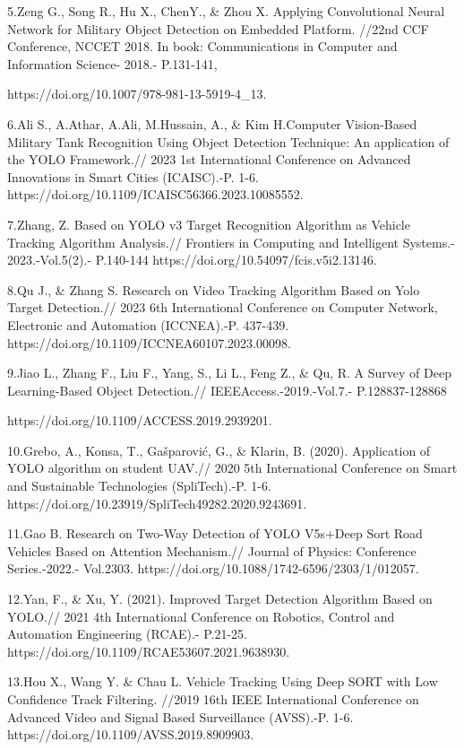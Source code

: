 5.Zeng G., Song R., Hu X., ChenY., \& Zhou X. Applying Convolutional
Neural Network for Military Object Detection on Embedded Platform.
//22nd CCF Conference, NCCET 2018. In book: Communications in Computer
and Information Science- 2018.- P.131-141,

https://doi.org/10.1007/978-981-13-5919-4\_13.

6.Ali S., A.Athar, A.Ali, M.Hussain, A., \& Kim H.Computer Vision-Based
Military Tank Recognition Using Object Detection Technique: An
application of the YOLO Framework.// 2023 1st International Conference
on Advanced Innovations in Smart Cities (ICAISC).-P. 1-6.
https://doi.org/10.1109/ICAISC56366.2023.10085552.

7.Zhang, Z. Based on YOLO v3 Target Recognition Algorithm as Vehicle
Tracking Algorithm Analysis.// Frontiers in Computing and Intelligent
Systems.- 2023.-Vol.5(2).- P.140-144
https://doi.org/10.54097/fcis.v5i2.13146.~

8.Qu J., \& Zhang S. Research on Video Tracking Algorithm Based on Yolo
Target Detection.// 2023 6th International Conference on Computer
Network, Electronic and Automation (ICCNEA).-P. 437-439.
https://doi.org/10.1109/ICCNEA60107.2023.00098.

9.Jiao L., Zhang F., Liu F., Yang, S., Li L., Feng Z., \& Qu, R. A
Survey of Deep Learning-Based Object Detection.//
IEEEAccess.-2019.-Vol.7.- P.128837-128868

https://doi.org/10.1109/ACCESS.2019.2939201.

10.Grebo, A., Konsa, T., Gašparović, G., \& Klarin, B. (2020).
Application of YOLO algorithm on student UAV.// 2020 5th International
Conference on Smart and Sustainable Technologies (SpliTech).-P. 1-6.
https://doi.org/10.23919/SpliTech49282.2020.9243691.

11.Gao B. Research on Two-Way Detection of YOLO V5s+Deep Sort Road
Vehicles Based on Attention Mechanism.// Journal of Physics: Conference
Series.-2022.- Vol.2303.
https://doi.org/10.1088/1742-6596/2303/1/012057.

12.Yan, F., \& Xu, Y. (2021). Improved Target Detection Algorithm Based
on YOLO.// 2021 4th International Conference on Robotics, Control and
Automation Engineering (RCAE).- P.21-25.
https://doi.org/10.1109/RCAE53607.2021.9638930.

13.Hou X., Wang Y. \& Chau L. Vehicle Tracking Using Deep SORT with Low
Confidence Track Filtering. //2019 16th IEEE International Conference on
Advanced Video and Signal Based Surveillance (AVSS).-P. 1-6.
https://doi.org/10.1109/AVSS.2019.8909903.

